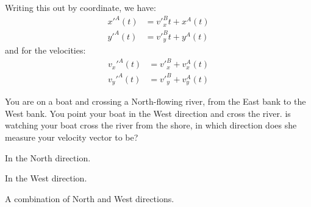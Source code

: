 
Writing this out by coordinate, we have:
\begin{align*}
x'^A(t)&=v'^B_xt+x^A(t)\\
y'^A(t)&=v'^B_yt+y^A(t)
\end{align*}
and for the velocities:
\begin{align*}
v_x'^A(t)&=v'^B_x+v_x^A(t)\\
v_y'^A(t)&=v'^B_y+v_y^A(t)
\end{align*}


\begin{checkpoint}{\begin{MCquestion}{You are on a boat and crossing a North-flowing river, from the East bank to the West bank. You point your boat in the West direction and cross the river. \chloe is watching your boat cross the river from the shore, in which direction does she measure your velocity vector to be?}
\item In the North direction.
\item In the West direction.
\item A combination of North and West directions.\correct
\end{MCquestion}}
\end{checkpoint}


